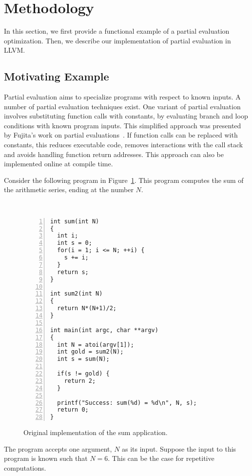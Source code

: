 \section{Methodology}
\label{sec:methodology}

In this section, we first provide a functional example of a partial evaluation optimization. Then, we describe our implementation of partial evaluation in LLVM.

\subsection{Motivating Example}
\label{sec:motivatingexample}
Partial evaluation aims to specialize programs with respect to known inputs.
A number of partial evaluation techniques exist.
One variant of partial evaluation involves substituting function calls with constants, by evaluating branch and loop conditions with known program inputs.
This simplified approach was presented by Fujita’s work on partial evaluations~\cite{Fujita}.
If function calls can be replaced with constants, this reduces executable code, removes interactions with the call stack and avoids handling function return addresses.
This approach can also be implemented online at compile time.

Consider the following program in Figure~\ref{fig:original_sum}.
This program computes the sum of the arithmetic series, ending at the number $N$.

\begin{figure}[htbp]\
\begin{Verbatim}[frame=single,fontsize={\scriptsize},numbers=left,numbersep=5pt,xleftmargin=10pt]
int sum(int N)
{
  int i;
  int s = 0;
  for(i = 1; i <= N; ++i) {
    s += i;
  }
  return s;
}

int sum2(int N)
{
  return N*(N+1)/2;
}

int main(int argc, char **argv)
{
  int N = atoi(argv[1]);
  int gold = sum2(N);
  int s = sum(N);

  if(s != gold) {
    return 2;
  }

  printf("Success: sum(%d) = %d\n", N, s);
  return 0;
}
\end{Verbatim}
\caption{Original implementation of the sum application.}
\label{fig:original_sum}
\end{figure}

The program accepts one argument, $N$ as its input.
Suppose the input to this program is known such that $N = 6$. 
This can be the case for repetitive computations. 

